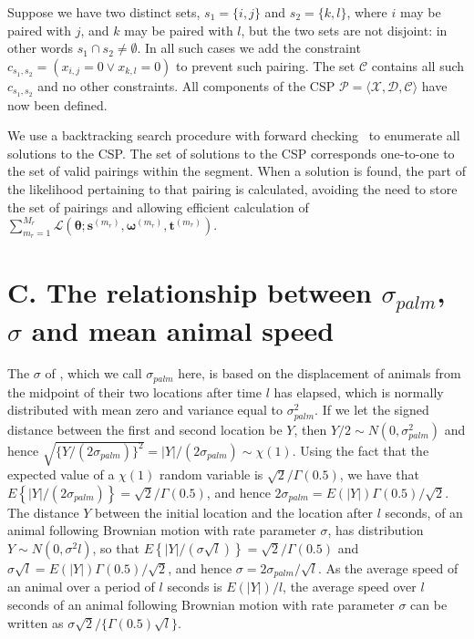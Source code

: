 \documentclass[useAMS, usenatbib, referee]{biom}\usepackage[]{graphicx}\usepackage[]{color}
\begin{document}
Suppose we have two distinct sets, \(s_1=\{i,j\}\) and \(s_2=\{k,l\}\), where  \(i\) may be paired with \(j\), and \(k\) may be paired with \(l\), but the two sets are not disjoint: in other words \(s_1 \cap s_2 \ne \emptyset\). In all such cases we add the constraint \(c_{s_1,s_2} = (x_{i,j} = 0 \vee x_{k,l} = 0)\) to prevent such pairing. The set \(\mathcal{C}\) contains all such \(c_{s_1,s_2}\) and no other constraints.  All components of the CSP \(\mathcal{P}=\langle \mathcal{X},\mathcal{D},\mathcal{C} \rangle\) have now been defined.

We use a backtracking search procedure with forward checking~\cite[Chapter 6]{russell-norvig-aima3} to enumerate all solutions to the CSP. The set of solutions to the CSP corresponds one-to-one to the set of valid pairings within the segment. When a solution is found, the part of the likelihood pertaining to that pairing is calculated, avoiding the need to store the set of pairings and allowing efficient calculation of $\sum_{m_r=1}^{M_r}\mathcal{L}\left(\bm{\theta};\bm{s}^{(m_r)},\bm{\omega}^{(m_r)},\bm{t}^{(m_r)}\right)$.


\section{C. The relationship between $\sigma_{palm}$, $\sigma$ and mean animal speed}
\label{appx:sigmaspd}

The $\sigma$ of \cite{Stevenson+al:19}, which we call $\sigma_{palm}$ here, is based on the displacement of animals from the midpoint of their two locations after time $l$ has elapsed, which is normally distributed with mean zero and variance equal to $\sigma_{palm}^2$. If we let the signed distance between the first and second location be $Y$, then $Y/2\sim N(0,\sigma_{palm}^2)$ and hence $\sqrt{\{Y/(2\sigma_{palm})\}^2}=|Y|/(2\sigma_{palm})\sim\chi(1)$. Using the fact that the expected value of a $\chi(1)$ random variable is $\sqrt{2}/\Gamma(0.5)$, we have that $E\left\{|Y|/(2\sigma_{palm})\right\}=\sqrt{2}/\Gamma(0.5)$, and hence $2\sigma_{palm}=E(|Y|)\Gamma(0.5)/\sqrt{2}$. The distance $Y$ between the initial location and the location after $l$ seconds, of an animal following Brownian motion with rate parameter $\sigma$, has distribution $Y\sim N(0,\sigma^2l)$, so that $E\left\{|Y|/(\sigma\sqrt{l})\right\}=\sqrt{2}/\Gamma(0.5)$ and $\sigma\sqrt{l}=E(|Y|)\Gamma(0.5)/\sqrt{2}$, and hence $\sigma=2\sigma_{palm}/\sqrt{l}$. As the average speed of an animal over a period of $l$ seconds is $E(|Y|)/l$, the average speed over $l$ seconds of an animal following Brownian motion with rate parameter $\sigma$ can be written as $\sigma\sqrt{2}/\{\Gamma(0.5)\sqrt{l}\}$.
\end{document}
